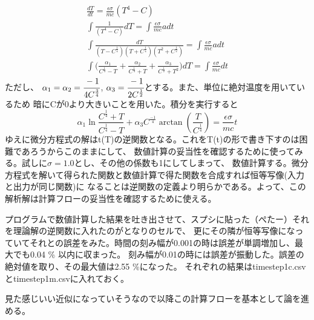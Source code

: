 \documentclass{ltjsarticle}
\begin{document}
\begin{align*}
  \frac{dT}{dt} = \frac{\epsilon \sigma}{m c}  ( T^{4} - C ) \\
  \int \frac{1}{( T^{4} -C )} dT = \int \frac{\epsilon \sigma}{m c} a dt \\
  \int \frac{dT}{( T -C^{\frac{1}{4}} )( T +C^{\frac{1}{4}} )( T^{2} +C^{\frac{1}{2}})} 
  = \int \frac{\epsilon \sigma}{m c} a dt \\
  \int \lparen \frac{\alpha_{1}}{C^{\frac{1}{4}} -T} 
              + \frac{\alpha_{2}}{C^{\frac{1}{4}} + T}
              + \frac{\alpha_{3}}{C^{\frac{1}{2}} + T^{2}} \rparen dT
  = \int \frac{\epsilon \sigma}{m c}  dt 
\end{align*}
ただし、
$\alpha_{1} =  \alpha_{2} = \cfrac{-1}{4C^{\frac{3}{4}}}$,
$\alpha_{3} = \cfrac{-1}{2C^{\frac{1}{2}}}$とする。また、単位に絶対温度を用いているため
暗にCが0より大きいことを用いた。積分を実行すると
\begin{equation*}
   \alpha_{1} \ln \frac{ C^{\frac{1}{4}} + T }
          { C^{\frac{1}{4}} - T }  + 
  \alpha_{3} C^{\frac{-1}{4}} \arctan(\frac{T}{C^{\frac{1}{4}}}) = \frac{\epsilon \sigma}{m c} t
\end{equation*}
ゆえに微分方程式の解はt(T)の逆関数となる。これをT(t)の形で書き下すのは困難であろうからこのままにして、
数値計算の妥当性を確認するために使ってみる。試しに$\sigma=1.0$とし、その他の係数も1にしてしまって、
数値計算する。微分方程式を解いて得られた関数と数値計算で得た関数を合成すれば恒等写像(入力と出力が同じ関数)に
なることは逆関数の定義より明らかである。よって、この解析解は計算フローの妥当性を確認するために使える。\par
プログラムで数値計算した結果を吐き出させて、スプシに貼った（ぺたー）それを理論解の逆関数に入れたのがとなりのセルで、
更にその隣が恒等写像になっていてそれとの誤差をみた。時間の刻み幅が0.001の時は誤差が単調増加し、最大でも0.04 \% 以内に収まった。
刻み幅が0.01の時には誤差が振動した。誤差の絶対値を取り、その最大値は2.55 \%になった。
それぞれの結果はtimestep1c.csv とtimestep1m.csvに入れておく。\par
見た感じいい近似になっていそうなので以降この計算フローを基本として論を進める。
\end{document}
